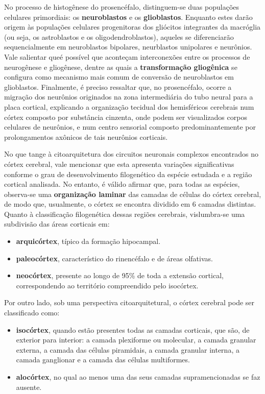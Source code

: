 \documentclass[
]{book}
\providecommand{\tightlist}{%
  \setlength{\itemsep}{0pt}\setlength{\parskip}{0pt}}
\theoremstyle{definition}
\theoremstyle{definition}
\theoremstyle{definition}
\theoremstyle{definition}
\theoremstyle{remark}
\begin{document}
No processo de histogênese do prosencéfalo, distinguem-se duas populações celulares primordiais: os \textbf{neuroblastos} e os \textbf{glioblastos}. Enquanto estes darão origem às populações celulares progenitoras dos gliócitos integrantes da macróglia (ou seja, os astroblastos e os oligodendroblastos), aqueles se diferenciarão sequencialmente em neuroblastos bipolares, neurblastos unipolares e neurônios. Vale salientar queé possível que aconteçam interconexões entre os processos de neurogênese e gliogênese, dentre as quais a \textbf{transformação gliogênica} se configura como mecanismo mais comum de conversão de neuroblastos em glioblastos. Finalmente, é preciso ressaltar que, no prosencéfalo, ocorre a migração dos neurônios originados na zona intermediária do tubo neural para a placa cortical, explicando a organização tecidual dos hemisféricos cerebrais num córtex composto por substância cinzenta, onde podem ser visualizados corpos celulares de neurônios, e num centro sensorial composto predominantemente por prolongamentos axônicos de tais neurônios corticais.

No que tange à citoarquitetura dos circuitos neuronais complexos encontrados no córtex cerebral, vale mencionar que esta apresenta variações significativas conforme o grau de desenvolvimento filogenético da espécie estudada e a região cortical analisada. No entanto, é válido afirmar que, para todas as espécies, observa-se uma \textbf{organização laminar} das camadas de células do córtex cerebral, de modo que, usualmente, o córtex se encontra dividido em 6 camadas distintas. Quanto à classificação filogenética dessas regiões cerebrais, vislumbra-se uma subdivisão das áreas corticais em:

\begin{itemize}
\tightlist
\item
  \textbf{arquicórtex}, típico da formação hipocampal.
\item
  \textbf{paleocórtex}, característico do rinencéfalo e de áreas olfativas.
\item
  \textbf{neocórtex}, presente ao longo de 95\% de toda a extensão cortical, correspondendo ao território compreendido pelo isocórtex.
\end{itemize}

Por outro lado, sob uma perspectiva citoarquitetural, o córtex cerebral pode ser classificado como:

\begin{itemize}
\tightlist
\item
  \textbf{isocórtex}, quando estão presentes todas as camadas corticais, que são, de exterior para interior: a camada plexiforme ou molecular, a camada granular externa, a camada das células piramidais, a camada granular interna, a camada ganglionar e a camada das células multiformes.
\item
  \textbf{alocórtex}, no qual ao menos uma das seus camadas supramencionadas se faz ausente.
\end{itemize}
\end{document}
